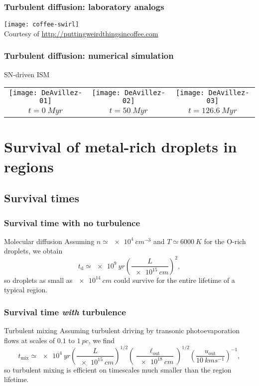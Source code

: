 \documentclass[presentation, compress]{beamer}
\begin{document}
\begin{frame}
  \frametitle{Turbulent diffusion: laboratory analogs}
  \centering
  \texttt{[image: coffee-swirl]}\\
  \smallskip
  Courtesy of \url{http://puttingweirdthingsincoffee.com}
\end{frame}

\begin{frame}
  \frametitle{Turbulent diffusion: numerical simulation}
  \begin{block}{SN-driven ISM }
    \bigskip
    \begin{tabular}{@{}c@{\,}c@{\,}c@{}}
      \texttt{[image: DeAvillez-01]} &
      \texttt{[image: DeAvillez-02]} &
      \texttt{[image: DeAvillez-03]} \\
      \(t = \SI{0}{Myr} \) &  
      \(t = \SI{50}{Myr} \) &  
      \(t = \SI{126.6}{Myr} \) \\
    \end{tabular}
  \end{block}
\end{frame}



\section{Survival of metal-rich droplets in \hii{} regions}

\subsection{Survival times}


\begin{frame}
  \frametitle{Survival time with no turbulence}
  \begin{block}{Molecular diffusion}
    Assuming \(n \simeq \SI{e4}{cm^{-3}}\) and \(T \simeq \SI{6000}{K}\) for the O-rich droplets, we obtain
    \[
    t_\mathrm{d} \simeq \SI{e9}{yr} \left( \frac{L}{\SI{e15}{cm}} \right)^2, 
    \]
    so droplets as small as \(\SI{e14}{cm}\) could survive for the entire lifetime of a typical \hii{} region. 
  \end{block}

\end{frame}

\begin{frame}
  \frametitle{Survival time \emph{with} turbulence}
  \begin{block}{Turbulent mixing}
    Assuming turbulent driving by transonic photoevaporation flows at scales of \(0.1\) to \(\SI{1}{pc}\), we find
    \[
    t_\mathrm{mix} \simeq \SI{e4}{yr} \left( \frac{L}{\SI{e15}{cm}} \right)^{1/2} \left( \frac{\ell_\mathrm{out}}{\SI{e18}{cm}} \right)^{1/2}  
    \left( \frac{u_\mathrm{out}}{\SI{10}{km s^{-1}}} \right)^{-1}, 
    \]
    so turbulent mixing is efficient on timescales much smaller than the \hii{} region lifetime. 
  \end{block}
\end{frame}
\end{document}
